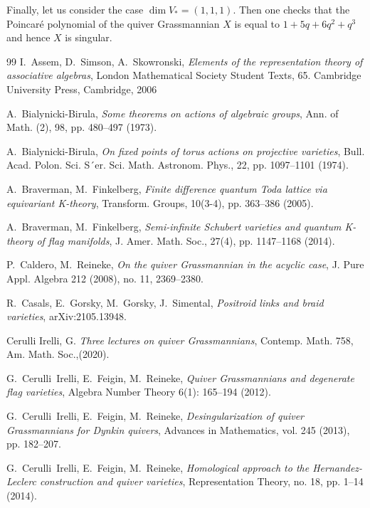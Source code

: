 \documentclass[12pt,a4paper]{amsart}
\numberwithin{equation}{section}
\theoremstyle{remark}
\begin{document}
Finally, let us consider the case $\dim V_*=(1,1,1)$. Then one checks that the 
Poincar\'e polynomial of the quiver Grassmannian $X$   is equal to
 $1+5q+6q^2+q^3$ and hence $X$ is singular. 




\begin{thebibliography}{99}
I.~Assem, D.~Simson, A.~Skowronski, 
\emph{Elements of the representation theory of associative
algebras}, London Mathematical Society Student
Texts, 65. Cambridge University Press, Cambridge, 2006

A.~Bialynicki-Birula,
\emph{Some theorems on actions of algebraic groups}, Ann. of Math. (2), 98, pp. 480--497 (1973).

A.~Bialynicki-Birula,
\emph{On fixed points of torus actions on projective varieties},
Bull. Acad. Polon. Sci. S´er. Sci. Math. Astronom. Phys., 22, pp. 1097--1101 (1974).

A.~Braverman, M.~Finkelberg, 
\emph{Finite difference quantum Toda lattice via equivariant K-theory},
Transform. Groups, 10(3-4), pp. 363--386 (2005).

A.~Braverman, M.~Finkelberg, 
\emph{Semi-infinite Schubert varieties and quantum K-theory of flag manifolds},
J. Amer. Math. Soc., 27(4), pp. 1147--1168 (2014).


P.~Caldero, M.~Reineke, 
\emph{On the quiver Grassmannian in the acyclic case}, 
J. Pure Appl. Algebra 212 (2008), no. 11, 2369--2380.

R.~Casals, E.~Gorsky, M.~Gorsky, J.~Simental,
\emph{Positroid links and braid varieties}, arXiv:2105.13948.

 Cerulli Irelli, G. 
\emph{Three lectures on quiver Grassmannians}, Contemp. Math. 758, Am. Math. Soc.,(2020).

 G.~Cerulli~Irelli, E.~Feigin, M.~Reineke, 
\emph{Quiver Grassmannians and degenerate flag varieties}, 
Algebra Number Theory 6(1): 165--194 (2012).

 G.~Cerulli~Irelli, E.~Feigin, M.~Reineke, 
\emph{Desingularization of quiver Grassmannians for Dynkin quivers}, 
Advances in Mathematics, vol. 245 (2013), pp. 182--207.

  G.~Cerulli~Irelli, E.~Feigin, M.~Reineke,
\emph{Homological approach to the Hernandez-Leclerc construction and quiver varieties},
Representation Theory, no. 18, pp. 1--14 (2014).


\end{thebibliography}
\end{document}
